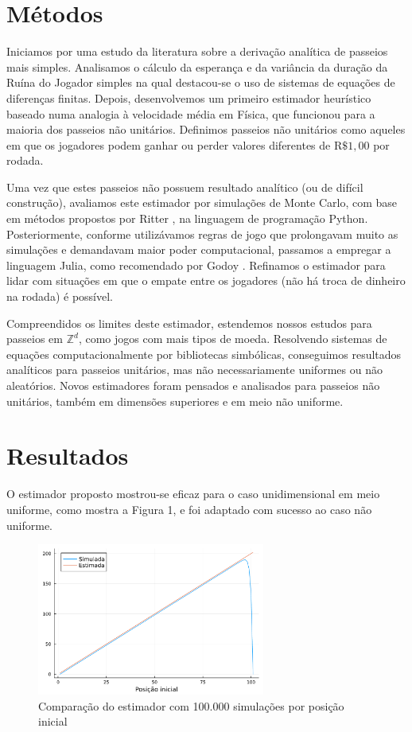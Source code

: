 \documentclass[a4paper,10pt,twocolumn]{article}
\begin{document}
\section{Métodos}

Iniciamos por uma estudo da literatura sobre a derivação analítica de passeios
mais simples. Analisamos o cálculo da esperança e da variância da duração da
Ruína do Jogador simples \cite{andel_variance_2012} na qual destacou-se o uso de
sistemas de equações de diferenças finitas. Depois, desenvolvemos um primeiro
estimador heurístico baseado numa analogia à velocidade média em Física, que
funcionou para a maioria dos passeios não unitários. Definimos passeios não
unitários como aqueles em que os jogadores podem ganhar ou perder valores
diferentes de $\mathrm{R}\$1,00$ por rodada.

Uma vez que estes passeios não possuem resultado analítico (ou de difícil
construção), avaliamos este estimador por simulações de Monte Carlo, com base em
métodos propostos por Ritter \cite{ritter_determining_2011}, na linguagem de
programação Python. Posteriormente, conforme utilizávamos regras de jogo que
prolongavam muito as simulações e demandavam maior poder computacional, passamos
a empregar a linguagem Julia, como recomendado por Godoy
\cite{godoy_evaluating_2023}. Refinamos o estimador para lidar com situações em
que o empate entre os jogadores (não há troca de dinheiro na rodada) é
possível.

Compreendidos os limites deste estimador, estendemos nossos estudos para
passeios em $\mathbb{Z}^d$, como jogos com mais tipos de moeda. Resolvendo
sistemas de equações computacionalmente por bibliotecas simbólicas, conseguimos
resultados analíticos para passeios unitários, mas não necessariamente uniformes
ou não aleatórios. Novos estimadores foram pensados e analisados para passeios
não unitários, também em dimensões superiores e em meio não uniforme.

\section{Resultados}

O estimador proposto mostrou-se eficaz para o caso unidimensional em meio
uniforme, como mostra a Figura 1, e foi adaptado com sucesso ao caso não
uniforme.

\begin{figure}[H]
    \caption{Comparação do estimador com 100.000 simulações por posição inicial}
    \centering
    \includegraphics[width=7.5cm]{"graficoest.pdf"}
\end{figure}
\end{document}
